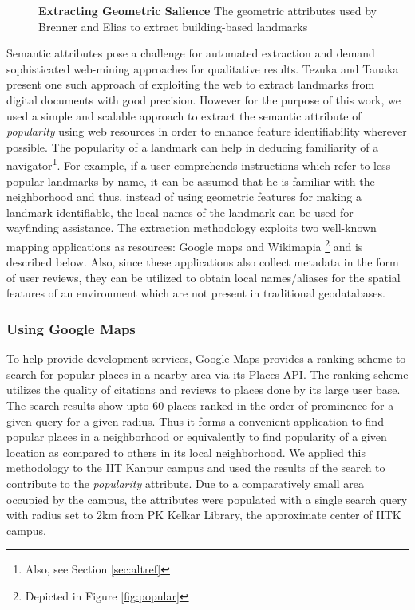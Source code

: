 \documentclass{iitkthesis}
\begin{document}
\begin{figure}
\centering
{}
\caption{\textbf{Extracting Geometric Salience} The geometric attributes 
used by Brenner and Elias \cite{brenner} to extract building-based 
landmarks}
\label{fig:elias}
 \end{figure}

Semantic attributes pose a challenge for automated extraction and demand 
sophisticated web-mining approaches for qualitative results. Tezuka 
and Tanaka~\cite{tezuka} present one such approach of exploiting the
web to extract landmarks from digital documents with good precision. 
However for the purpose of this work, we used a simple and scalable 
approach to extract the semantic attribute of \textit{popularity} using web 
resources in order to enhance feature identifiability wherever possible. 
The popularity of a landmark can help in deducing familiarity of a 
navigator\footnote{Also, see Section \ref{sec:altref}}. For example, if a 
user comprehends instructions which refer to less popular landmarks by 
name, it can be assumed that he is familiar with the neighborhood 
and thus, instead of using geometric features for making a landmark 
identifiable, the local names of the landmark can be used for wayfinding 
assistance. The extraction methodology exploits two well-known mapping 
applications as resources: Google maps \cite{gmaps} and Wikimapia 
\cite{wiki}\footnote{Depicted in Figure \ref{fig:popular}} and is 
described below.  Also, since these applications also collect metadata in 
the form of user reviews, they can be utilized to obtain local names/aliases 
for the spatial features of an environment which are not present in 
traditional geodatabases.
\subsubsection*{Using Google Maps}
To help provide development services, Google-Maps provides a ranking 
scheme to search for popular places in a nearby area via its Places API. 
The ranking scheme utilizes the quality of citations and reviews to 
places done by its large user base. The search results show 
upto 60 places ranked in the order of prominence for a given query for a 
given radius. Thus it forms a convenient application to find popular 
places in a neighborhood or equivalently to find popularity of a given 
location as compared to others in its local neighborhood. We applied this 
methodology to the IIT Kanpur campus and used the results of the search to 
contribute to the \textit{popularity} attribute. Due to a comparatively 
small area occupied by the campus, the attributes were populated with a 
single search query with radius set to 2km from PK Kelkar Library, the 
approximate center of IITK campus.
\end{document}
